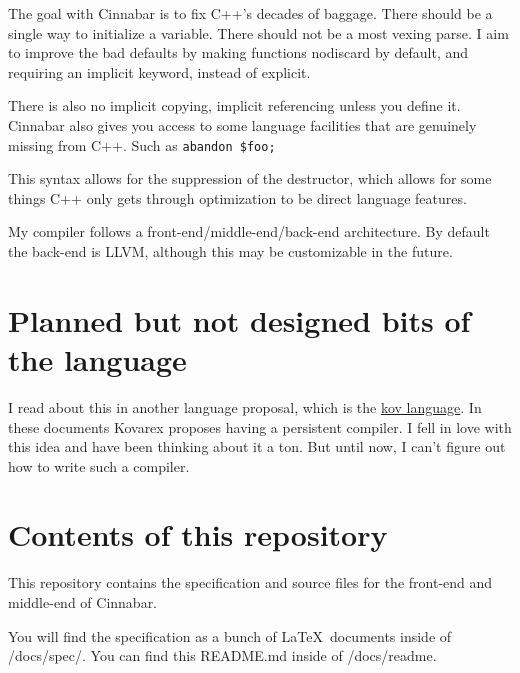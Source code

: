\para The goal with Cinnabar is to fix C++'s decades of baggage. There should be a single way to initialize a variable. There should not be a most vexing parse. I aim to improve the bad defaults by making functions nodiscard by default, and requiring an implicit keyword, instead of explicit.

\para There is also no implicit copying, implicit referencing unless you define it. Cinnabar also gives you access to some language facilities that are genuinely missing from C++. Such as \verb|abandon $foo;|

\para This syntax allows for the suppression of the destructor, which allows for some things C++ only gets through optimization to be direct language features.

My compiler follows a front-end/middle-end/back-end architecture. By default the back-end is LLVM, although this may be customizable in the future.



\section{Planned but not designed bits of the language}
\para I read about this in another language proposal, which is the \href{https://github.com/wube/kov}{kov language}. In these documents Kovarex proposes having a persistent compiler. I fell in love with this idea and have been thinking about it a ton. But until now, I can't figure out how to write such a compiler.

\section{Contents of this repository}
\para This repository contains the specification and source files for the front-end and middle-end of Cinnabar.

\para You will find the specification as a bunch of \LaTeX\ documents inside of /docs/spec/. You can find this README.md inside of /docs/readme.

\newpage


